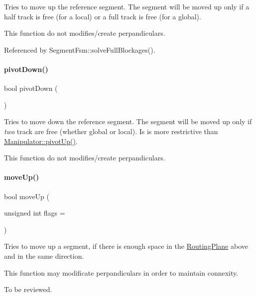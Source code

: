 Tries to move up the reference segment. The segment will be moved up only if a half track is free (for a local) or a full track is free (for a global).

This function do not modifies/create perpandiculars. 

Referenced by Segment\+Fsm\+::solve\+Full\+Blockages().

\mbox{\label{classKite_1_1Manipulator_ac3b48ad16d9b9b63d1c68e526ceb42e8}} 
\paragraph{\texorpdfstring{pivot\+Down()}{pivotDown()}}
{\footnotesize\ttfamily bool pivot\+Down (\begin{DoxyParamCaption}{ }\end{DoxyParamCaption})}

Tries to move down the reference segment. The segment will be moved up only if {\itshape two} track are free (whether global or local). Is is more restrictive than \hyperlink{classKite_1_1Manipulator_ad590137c4e7e8d5ad2a6f510e0d70e81}{Manipulator\+::pivot\+Up()}.

This function do not modifies/create perpandiculars. \mbox{\label{classKite_1_1Manipulator_ac954731e16188acb6984f348bf2d9d20}} 
\paragraph{\texorpdfstring{move\+Up()}{moveUp()}}
{\footnotesize\ttfamily bool move\+Up (\begin{DoxyParamCaption}\item[{unsigned int}]{flags = {} }\end{DoxyParamCaption})}

Tries to move up a segment, if there is enough space in the \hyperlink{classKite_1_1RoutingPlane}{Routing\+Plane} above and in the same direction.

This function may modificate perpandiculars in order to maintain connexity.

To be reviewed. 

